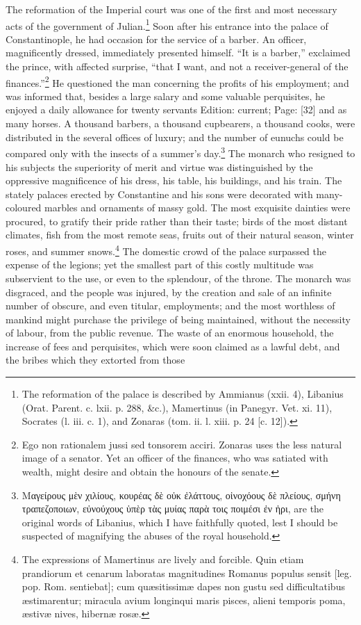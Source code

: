 The reformation of the Imperial court was one of the first and most necessary acts of the government of Julian.\footnote{The reformation of the palace is described by Ammianus (xxii. 4), Libanius (Orat. Parent. c. lxii. p. 288, \&c.), Mamertinus (in Panegyr. Vet. xi. 11), Socrates (l. iii. c. 1), and Zonaras (tom. ii. l. xiii. p. 24 [c. 12]).} Soon after his entrance into the palace of Constantinople, he had occasion for the service of a barber. An officer, magnificently dressed, immediately presented himself. \texthebrew{“}It is a barber,\texthebrew{}” exclaimed the prince, with affected surprise, \texthebrew{“}that I want, and not a receiver-general of the finances.\texthebrew{}”\footnote{Ego non rationalem jussi sed tonsorem acciri. Zonaras uses the less natural image of a senator. Yet an officer of the finances, who was satiated with wealth, might desire and obtain the honours of the senate.} He questioned the man concerning the profits of his employment; and was informed that, besides a large salary and some valuable perquisites, he enjoyed a daily allowance for twenty servants Edition: current; Page: [32] and as many horses. A thousand barbers, a thousand cupbearers, a thousand cooks, were distributed in the several offices of luxury; and the number of eunuchs could be compared only with the insects of a summer\texthebrew{}’s day.\footnote{\textgreek{Μαγείρους μ\texthebrew{ὲ}ν χιλίους, κουρέας δ\texthebrew{ὲ} ο\texthebrew{ὐ}κ \texthebrew{ἐ}λάττους, ο\texthebrew{ἰ}νοχόους δ\texthebrew{ὲ} πλείους, σμήνη τραπεζοποιων, ε\texthebrew{ὐ}νούχους \texthebrew{ὑ}π\texthebrew{ὲ}ρ τ\texthebrew{ὰ}ς μυίας παρ\texthebrew{ὰ} τοις ποιμέσι \texthebrew{ἐ}ν \texthebrew{ἠ}ρι}, are the original words of Libanius, which I have faithfully quoted, lest I should be suspected of magnifying the abuses of the royal household.} The monarch who resigned to his subjects the superiority of merit and virtue was distinguished by the oppressive magnificence of his dress, his table, his buildings, and his train. The stately palaces erected by Constantine and his sons were decorated with many-coloured marbles and ornaments of massy gold. The most exquisite dainties were procured, to gratify their pride rather than their taste; birds of the most distant climates, fish from the most remote seas, fruits out of their natural season, winter roses, and summer snows.\footnote{The expressions of Mamertinus are lively and forcible. Quin etiam prandiorum et cenarum laboratas magnitudines Romanus populus sensit [leg. pop. Rom. sentiebat]; cum quæsitissimæ dapes non gustu sed difficultatibus æstimarentur; miracula avium longinqui maris pisces, alieni temporis poma, æstivæ nives, hibernæ rosæ.} The domestic crowd of the palace surpassed the expense of the legions; yet the smallest part of this costly multitude was subservient to the use, or even to the splendour, of the throne. The monarch was disgraced, and the people was injured, by the creation and sale of an infinite number of obscure, and even titular, employments; and the most worthless of mankind might purchase the privilege of being maintained, without the necessity of labour, from the public revenue. The waste of an enormous household, the increase of fees and perquisites, which were soon claimed as a lawful debt, and the bribes which they extorted from those 